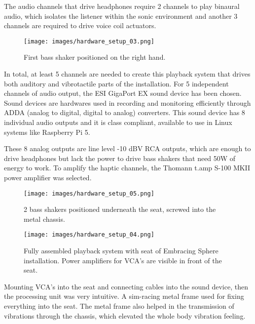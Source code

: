         The audio channels that drive headphones require 2 channels to play binaural audio, which isolates the listener within the sonic environment and another 3 channels are required to drive voice coil actuators.\par

        \begin{figure}[H]
            \centering
            \texttt{[image: images/hardware\_setup\_03.png]}
            \caption{First bass shaker positioned on the right hand.}
            \label{fig:HARD_SETUP_03}
        \end{figure}  

        In total, at least 5 channels are needed to create this playback system that drives both auditory and vibrotactile parts of the installation. For 5 independent channels of audio output, the ESI GigaPort EX sound device has been chosen. Sound devices are hardwares used in recording and monitoring efficiently through ADDA (analog to digital, digital to analog) converters\cite{Sound_Reinforcement}. This sound device has 8 individual audio outputs and it is class compliant, available to use in Linux systems like Raspberry Pi 5.\par

        These 8 analog outputs are line level -10 dBV RCA outputs, which are enough to drive headphones but lack the power to drive bass shakers that need 50W of energy to work. To amplify the haptic channels, the Thomann t.amp S-100 MKII power amplifier was selected.\par

        \begin{figure}[H]
            \centering
            \texttt{[image: images/hardware\_setup\_05.png]}
            \caption{2 bass shakers positioned underneath the seat, screwed into the metal chassis.}
            \label{fig:HARD_SETUP_04}
        \end{figure} 

        \begin{figure}[H]
            \centering
            \texttt{[image: images/hardware\_setup\_04.png]}
            \caption{Fully assembled playback system with seat of Embracing Sphere installation. Power amplifiers for VCA's are visible in front of the seat.}
            \label{fig:HARD_SETUP_05}
        \end{figure}

        Mounting VCA's into the seat and connecting cables into the sound device, then the processing unit was very intuitive. A sim-racing metal frame used for fixing everything into the seat. The metal frame also helped in the transmission of vibrations through the chassis, which elevated the whole body vibration feeling.\par

